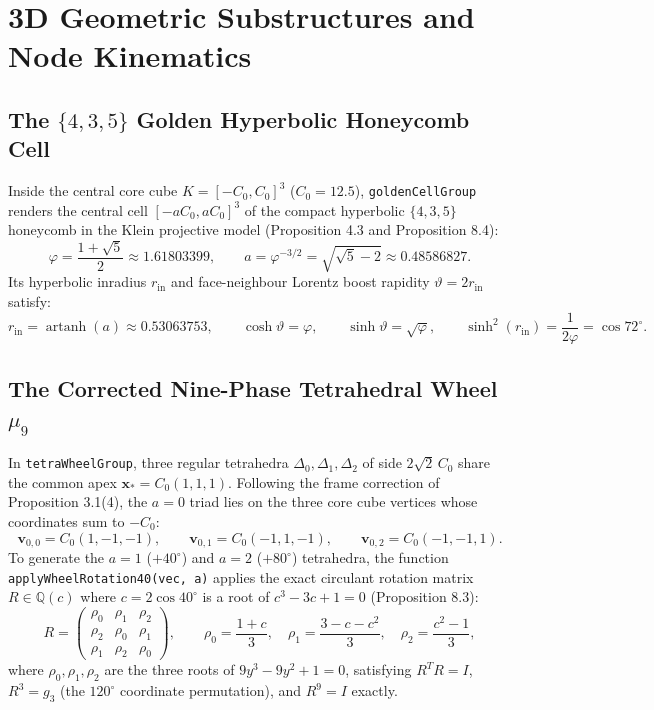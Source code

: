 \documentclass[11pt, a4paper]{article}
\begin{document}
\section{3D Geometric Substructures and Node Kinematics}

\subsection{The \texorpdfstring{$\{4,3,5\}$}{{4,3,5}} Golden Hyperbolic Honeycomb Cell}
Inside the central core cube $K = [-C_0, C_0]^3$ ($C_0 = 12.5$), \texttt{goldenCellGroup} renders the central cell $[-a C_0, a C_0]^3$ of the compact hyperbolic $\{4,3,5\}$ honeycomb in the Klein projective model (Proposition 4.3 and Proposition 8.4):
\begin{equation}
\varphi = \frac{1+\sqrt{5}}{2} \approx 1.61803399, \qquad a = \varphi^{-3/2} = \sqrt{\sqrt{5}-2} \approx 0.48586827.
\end{equation}
Its hyperbolic inradius $r_{\text{in}}$ and face-neighbour Lorentz boost rapidity $\vartheta = 2r_{\text{in}}$ satisfy:
\begin{equation}
r_{\text{in}} = \operatorname{artanh}(a) \approx 0.53063753, \qquad \cosh\vartheta = \varphi, \qquad \sinh\vartheta = \sqrt{\varphi}, \qquad \sinh^2(r_{\text{in}}) = \frac{1}{2\varphi} = \cos 72^\circ.
\end{equation}

\subsection{The Corrected Nine-Phase Tetrahedral Wheel \texorpdfstring{$\mu_9$}{mu9}}
In \texttt{tetraWheelGroup}, three regular tetrahedra $\Delta_0, \Delta_1, \Delta_2$ of side $2\sqrt{2}\,C_0$ share the common apex $\mathbf{x}_* = C_0(1,1,1)$. Following the frame correction of Proposition 3.1(4), the $a=0$ triad lies on the three core cube vertices whose coordinates sum to $-C_0$:
\begin{equation}
\mathbf{v}_{0,0} = C_0(1, -1, -1), \qquad \mathbf{v}_{0,1} = C_0(-1, 1, -1), \qquad \mathbf{v}_{0,2} = C_0(-1, -1, 1).
\end{equation}
To generate the $a=1$ ($+40^\circ$) and $a=2$ ($+80^\circ$) tetrahedra, the function \texttt{applyWheelRotation40(vec, a)} applies the exact circulant rotation matrix $R \in \mathbb{Q}(c)$ where $c = 2\cos 40^\circ$ is a root of $c^3 - 3c + 1 = 0$ (Proposition 8.3):
\begin{equation}
R = \begin{pmatrix} \rho_0 & \rho_1 & \rho_2 \\ \rho_2 & \rho_0 & \rho_1 \\ \rho_1 & \rho_2 & \rho_0 \end{pmatrix}, \qquad \rho_0 = \frac{1+c}{3}, \quad \rho_1 = \frac{3 - c - c^2}{3}, \quad \rho_2 = \frac{c^2 - 1}{3},
\end{equation}
where $\rho_0, \rho_1, \rho_2$ are the three roots of $9y^3 - 9y^2 + 1 = 0$, satisfying $R^T R = I$, $R^3 = g_3$ (the $120^\circ$ coordinate permutation), and $R^9 = I$ exactly.
\end{document}
